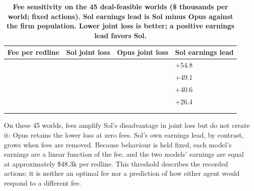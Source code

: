 \renewcommand{\thetable}{E.11}
\begin{longtable}[]{@{}
  >{\raggedright\arraybackslash}p{}
  >{\raggedleft\arraybackslash}p{}
  >{\raggedleft\arraybackslash}p{}
  >{\raggedleft\arraybackslash}p{}@{}}
\caption{\textbf{Fee sensitivity on the 45 deal-feasible worlds (\$ thousands per world; fixed actions). Sol earnings lead is Sol minus Opus against the firm population. Lower joint loss is better; a positive earnings lead favors Sol.}}\label{tab:E.11}\tabularnewline
\toprule\noalign{}
\begin{minipage}[b]{\linewidth}\raggedright
Fee per redline
\end{minipage} & \begin{minipage}[b]{\linewidth}\raggedleft
Sol joint loss
\end{minipage} & \begin{minipage}[b]{\linewidth}\raggedleft
Opus joint loss
\end{minipage} & \begin{minipage}[b]{\linewidth}\raggedleft
Sol earnings lead
\end{minipage} \\
\midrule\noalign{}
\endhead
\bottomrule\noalign{}
\endlastfoot
0 & 38.9 & 28.5 & +54.8 \\
5 & 56.0 & 35.6 & +49.1 \\
12.5 & 81.7 & 46.2 & +40.6 \\
25 & 124.4 & 63.8 & +26.4 \\
50 & 210.0 & 99.1 & -1.9 \\
100 & 381.1 & 169.6 & -58.6 \\
\end{longtable}

On these 45 worlds, fees amplify Sol's disadvantage in joint loss but do not create it: Opus retains the lower loss at
zero fees. Sol's own earnings lead, by contrast, grows when fees are removed. Because behaviour is held fixed, each
model's earnings are a linear function of the fee, and the two models' earnings are equal at approximately \$48.3k per
redline. This threshold describes the recorded actions; it is neither an optimal fee nor a prediction of how either
agent would respond to a different fee.

